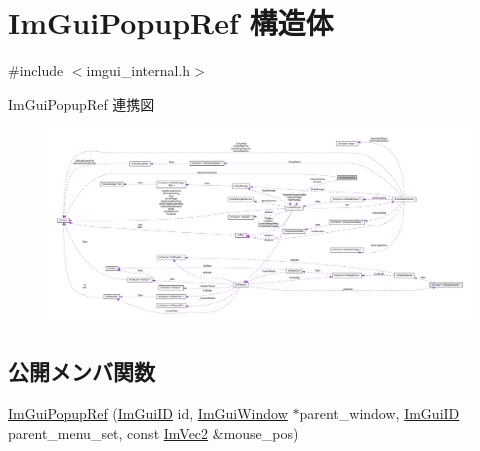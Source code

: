 \hypertarget{struct_im_gui_popup_ref}{}\section{Im\+Gui\+Popup\+Ref 構造体}
\label{struct_im_gui_popup_ref}


{\ttfamily \#include $<$imgui\+\_\+internal.\+h$>$}



Im\+Gui\+Popup\+Ref 連携図\nopagebreak
\begin{figure}[H]
\begin{center}
\leavevmode
\includegraphics[width=350pt]{struct_im_gui_popup_ref__coll__graph}
\end{center}
\end{figure}
\subsection*{公開メンバ関数}
\begin{DoxyCompactItemize}
\item 
\mbox{\hyperlink{struct_im_gui_popup_ref_af95848b705864b36b803745cd7b59250}{Im\+Gui\+Popup\+Ref}} (\mbox{\hyperlink{imgui_8h_a1785c9b6f4e16406764a85f32582236f}{Im\+Gui\+ID}} id, \mbox{\hyperlink{struct_im_gui_window}{Im\+Gui\+Window}} $\ast$parent\+\_\+window, \mbox{\hyperlink{imgui_8h_a1785c9b6f4e16406764a85f32582236f}{Im\+Gui\+ID}} parent\+\_\+menu\+\_\+set, const \mbox{\hyperlink{struct_im_vec2}{Im\+Vec2}} \&mouse\+\_\+pos)
\end{DoxyCompactItemize}
